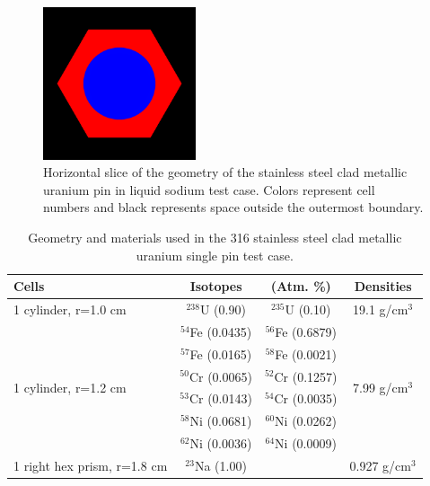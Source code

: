 \documentclass[preprint,12pt]{elsarticle}
\begin{document}
\begin{figure}[h!] 
  \centering
    \includegraphics[width=0.4\textwidth]{graphics/sodiumpin-xy.png}
     \caption{ Horizontal slice of the geometry of the stainless steel clad metallic uranium pin in liquid sodium test case.  Colors represent cell numbers and black represents space outside the outermost boundary. \label{sodiumpin_geom_pic} }
\end{figure}

\begin{table}[h]
\centering
\caption{Geometry and materials used in the 316 stainless steel clad metallic uranium single pin test case.}
\label{sodium_geom}
\begin{tabular}{| l | c  c  | c |}
\hline
Cells & Isotopes & (Atm. \%)     & Densities \\
\hline
\multirow{1}{*}{1 cylinder, r=1.0 cm }   &  $^{238}$U   (0.90)   & $^{235}$U   (0.10)   &    \multirow{1}{*}{19.1 g/cm$^3$} \\
\hline
\multirow{6}{*}{1 cylinder, r=1.2 cm }   &  $^{54}$Fe  (0.0435) & $^{56}$Fe  (0.6879)  &   \multirow{6}{*}{7.99 g/cm$^3$} \\
                                         &  $^{57}$Fe  (0.0165) & $^{58}$Fe  (0.0021)  &   \\
                                         &  $^{50}$Cr  (0.0065) & $^{52}$Cr  (0.1257)  &   \\
                                         &  $^{53}$Cr  (0.0143) & $^{54}$Cr  (0.0035)  &   \\
                                         &  $^{58}$Ni  (0.0681) & $^{60}$Ni  (0.0262)  &   \\
                                         &  $^{62}$Ni  (0.0036) &  $^{64}$Ni  (0.0009) &   \\
\hline
1 right hex prism, r=1.8 cm              &  $^{23}$Na   (1.00)  &                      &    0.927 g/cm$^3$ \\
\hline
\end{tabular}
\end{table}
\end{document}
